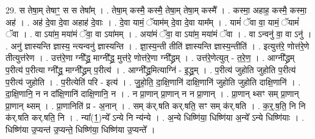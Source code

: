 \documentclass[17pt]{extarticle}
\begin{document}
29. स तेषा॒म् तेषाꣳ॒॒ स स तेषा᳚म् । . तेषा॒म् कस्मै॒ कस्मै॒ तेषा॒म् तेषा॒म् कस्मै᳚ । . कस्मा॒ अहाह॒ कस्मै॒ कस्मा॒ अह॑ । . अह॑ दे॒वा दे॒वा अहाह॑ दे॒वाः । . दे॒वा यामं॒ ॅयाम॑म् दे॒वा दे॒वा याम᳚म् । . यामं॑ ॅवा वा॒ यामं॒ ॅयामं॑ ॅवा । . वा ऽया॑म॒ मया॑मं ॅवा॒ वा ऽया॑मम् । . अया॑मं ॅवा॒ वा ऽया॑म॒ मया॑मं ॅवा । . वा ऽन्वनु॑ वा॒ वा ऽनु॑ । . अनु॑ ज्ञास्यन्ति ज्ञास्य॒ न्त्यन्वनु॑ ज्ञास्यन्ति । . ज्ञा॒स्य॒न्ती तीति॑ ज्ञास्यन्ति ज्ञास्य॒न्तीति॑ । . इत्युत्त॑रे॒ णोत्त॑रे॒णे तीत्युत्त॑रेण । . उत्त॑रे॒णा ग्नी᳚द्ध्र॒ माग्नी᳚द्ध्र॒ मुत्त॑रे॒ णोत्त॑रे॒णा ग्नी᳚द्ध्रम् । . उत्त॑रे॒णेत्युत् - त॒रे॒ण॒ । . आग्नी᳚द्ध्रम् प॒रीत्य॑ प॒रीत्या ग्नी᳚द्ध्र॒ माग्नी᳚द्ध्रम् प॒रीत्य॑ । . आग्नी᳚द्ध्र॒मित्याग्नि॑ - इ॒द्ध्र॒म् । . प॒रीत्य॑ जुहोति जुहोति प॒रीत्य॑ प॒रीत्य॑ जुहोति । . प॒रीत्येति॑ परि - इत्य॑ । . जु॒हो॒ति॒ दा॒क्षि॒णानि॑ दाक्षि॒णानि॑ जुहोति जुहोति दाक्षि॒णानि॑ । . दा॒क्षि॒णानि॒ न न दा᳚क्षि॒णानि॑ दाक्षि॒णानि॒ न । . न प्रा॒णान् प्रा॒णान् न न प्रा॒णान् । . प्रा॒णान् थ्सꣳ सम् प्रा॒णान् प्रा॒णान् थ्सम् । . प्रा॒णानिति॑ प्र - अ॒नान् । . सम् क॑र्.षति कर्.षति॒ सꣳ सम् क॑र्.षति । . क॒र्॒.ष॒ति॒ नि नि क॑र्.षति कर्.षति॒ नि । . न्या᳚(1॒)न्ये᳚ ऽन्ये नि न्य॑न्ये । . अ॒न्ये धिष्णि॑या॒ धिष्णि॑या अ॒न्ये᳚ ऽन्ये धिष्णि॑याः । . धिष्णि॑या उ॒प्यन्त॑ उ॒प्यन्ते॒ धिष्णि॑या॒ धिष्णि॑या उ॒प्यन्ते᳚ । \newline
\end{document}
